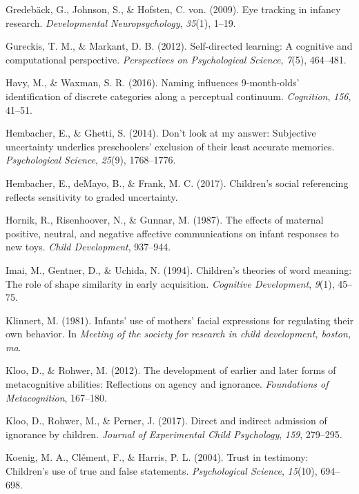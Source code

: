 \documentclass[floatsintext,man]{apa6}
\theoremstyle{definition}
\theoremstyle{definition}
\theoremstyle{definition}
\theoremstyle{remark}
\begin{document}
\hypertarget{ref-gredeback2009eye}{}
Gredebäck, G., Johnson, S., \& Hofsten, C. von. (2009). Eye tracking in
infancy research. \emph{Developmental Neuropsychology}, \emph{35}(1),
1--19.

\hypertarget{ref-gureckis2012self}{}
Gureckis, T. M., \& Markant, D. B. (2012). Self-directed learning: A
cognitive and computational perspective. \emph{Perspectives on
Psychological Science}, \emph{7}(5), 464--481.

\hypertarget{ref-havy2016naming}{}
Havy, M., \& Waxman, S. R. (2016). Naming influences 9-month-olds'
identification of discrete categories along a perceptual continuum.
\emph{Cognition}, \emph{156}, 41--51.

\hypertarget{ref-hembacher2014don}{}
Hembacher, E., \& Ghetti, S. (2014). Don't look at my answer: Subjective
uncertainty underlies preschoolers' exclusion of their least accurate
memories. \emph{Psychological Science}, \emph{25}(9), 1768--1776.

\hypertarget{ref-hembacherchildren}{}
Hembacher, E., deMayo, B., \& Frank, M. C. (2017). Children's social
referencing reflects sensitivity to graded uncertainty.

\hypertarget{ref-hornik1987effects}{}
Hornik, R., Risenhoover, N., \& Gunnar, M. (1987). The effects of
maternal positive, neutral, and negative affective communications on
infant responses to new toys. \emph{Child Development}, 937--944.

\hypertarget{ref-imai1994children}{}
Imai, M., Gentner, D., \& Uchida, N. (1994). Children's theories of word
meaning: The role of shape similarity in early acquisition.
\emph{Cognitive Development}, \emph{9}(1), 45--75.

\hypertarget{ref-klinnert1981infants}{}
Klinnert, M. (1981). Infants' use of mothers' facial expressions for
regulating their own behavior. In \emph{Meeting of the society for
research in child development, boston, ma}.

\hypertarget{ref-kloo2012development}{}
Kloo, D., \& Rohwer, M. (2012). The development of earlier and later
forms of metacognitive abilities: Reflections on agency and ignorance.
\emph{Foundations of Metacognition}, 167--180.

\hypertarget{ref-kloo2017direct}{}
Kloo, D., Rohwer, M., \& Perner, J. (2017). Direct and indirect
admission of ignorance by children. \emph{Journal of Experimental Child
Psychology}, \emph{159}, 279--295.

\hypertarget{ref-koenig2004trust}{}
Koenig, M. A., Clément, F., \& Harris, P. L. (2004). Trust in testimony:
Children's use of true and false statements. \emph{Psychological
Science}, \emph{15}(10), 694--698.
\end{document}
